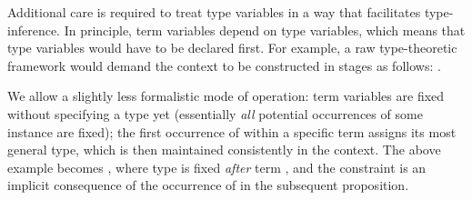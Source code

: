 \begin{isabellebody}
\begin{isamarkuptext}
  \medskip Additional care is required to treat type variables in a
  way that facilitates type-inference.  In principle, term variables
  depend on type variables, which means that type variables would have
  to be declared first.  For example, a raw type-theoretic framework
  would demand the context to be constructed in stages as follows:
  .

  We allow a slightly less formalistic mode of operation: term
  variables  are fixed without specifying a type yet
  (essentially \emph{all} potential occurrences of some instance
   are fixed); the first occurrence of 
  within a specific term assigns its most general type, which is then
  maintained consistently in the context.  The above example becomes
  , where type \isa{{\isasymalpha}} is fixed \emph{after} term , and the constraint
   is an implicit consequence of the occurrence of
   in the subsequent proposition.


\end{isamarkuptext}
\end{isabellebody}
